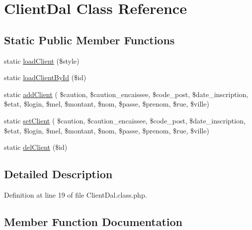 \hypertarget{class_client_dal}{}\section{Client\+Dal Class Reference}
\label{class_client_dal}
\subsection*{Static Public Member Functions}
\begin{DoxyCompactItemize}
\item 
static \hyperlink{class_client_dal_a28a664bb9f42ecb82aed0de767fdb4ef}{load\+Client} (\$style)
\item 
static \hyperlink{class_client_dal_acc8cc50fdd5f96e4d7f26b60ac06587a}{load\+Client\+By\+Id} (\$id)
\item 
static \hyperlink{class_client_dal_a8148269d23f4a7ca4c33b50f9d43b2ac}{add\+Client} ( \$caution, \$caution\+\_\+encaissee, \$code\+\_\+post, \$date\+\_\+inscription, \$etat, \$login, \$mel, \$montant, \$nom, \$passe, \$prenom, \$rue, \$ville)
\item 
static \hyperlink{class_client_dal_a985829a40cca58534db921261e760f53}{set\+Client} ( \$caution, \$caution\+\_\+encaissee, \$code\+\_\+post, \$date\+\_\+inscription, \$etat, \$login, \$mel, \$montant, \$nom, \$passe, \$prenom, \$rue, \$ville)
\item 
static \hyperlink{class_client_dal_a6bd71f3ea692f6ea594c230abd33e026}{del\+Client} (\$id)
\end{DoxyCompactItemize}


\subsection{Detailed Description}


Definition at line 19 of file Client\+Dal.\+class.\+php.



\subsection{Member Function Documentation}
\mbox{\label{class_client_dal_a8148269d23f4a7ca4c33b50f9d43b2ac}} 
